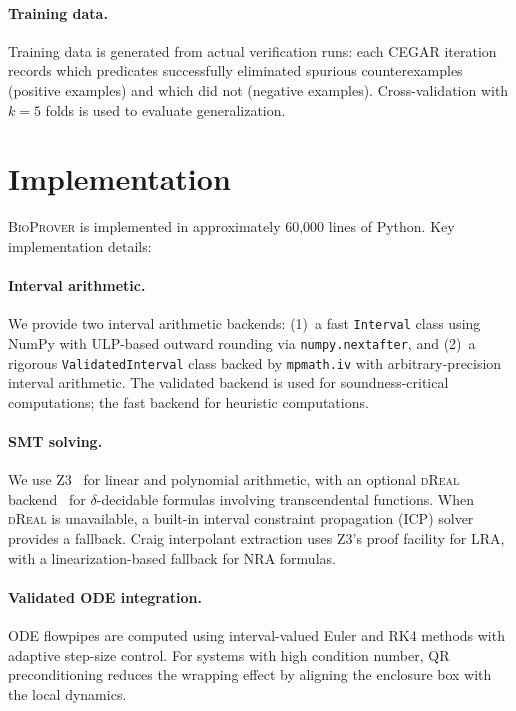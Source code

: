 \documentclass[11pt]{article}
\newcommand{\bioprover}{\textsc{BioProver}}
\newcommand{\cegar}{\textsc{CEGAR}}
\newcommand{\dreal}{\textsc{dReal}}
\begin{document}
\paragraph{Training data.}
Training data is generated from actual verification runs: each
\cegar{} iteration records which predicates successfully eliminated
spurious counterexamples (positive examples) and which did not
(negative examples). Cross-validation with $k=5$ folds is used to
evaluate generalization.

\section{Implementation}
\label{sec:implementation}

\bioprover{} is implemented in approximately 60,000 lines of Python.
Key implementation details:

\paragraph{Interval arithmetic.}
We provide two interval arithmetic backends: (1)~a fast
\texttt{Interval} class using NumPy with ULP-based outward rounding
via \texttt{numpy.nextafter}, and (2)~a rigorous
\texttt{ValidatedInterval} class backed by \texttt{mpmath.iv} with
arbitrary-precision interval arithmetic. The validated backend is used
for soundness-critical computations; the fast backend for heuristic
computations.

\paragraph{SMT solving.}
We use Z3~\cite{demoura2008z3} for linear and polynomial arithmetic,
with an optional \dreal{} backend~\cite{gao2013dreal} for
$\delta$-decidable formulas involving transcendental functions. When
\dreal{} is unavailable, a built-in interval constraint propagation
(ICP) solver provides a fallback. Craig interpolant extraction uses
Z3's proof facility for LRA, with a linearization-based fallback for
NRA formulas.

\paragraph{Validated ODE integration.}
ODE flowpipes are computed using interval-valued Euler and RK4
methods with adaptive step-size control. For systems with high
condition number, QR preconditioning reduces the wrapping effect by
aligning the enclosure box with the local dynamics.
\end{document}
